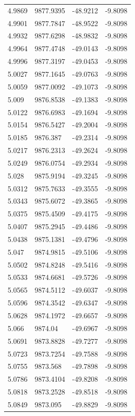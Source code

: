 \begin{table}[H]
\begin{tabular}{llll}
4.9869 & 9877.9395 & -48.9212 & -9.8098 \\
4.9901 & 9877.7847 & -48.9522 & -9.8098 \\
4.9932 & 9877.6298 & -48.9832 & -9.8098 \\
4.9964 & 9877.4748 & -49.0143 & -9.8098 \\
4.9996 & 9877.3197 & -49.0453 & -9.8098 \\
5.0027 & 9877.1645 & -49.0763 & -9.8098 \\
5.0059 & 9877.0092 & -49.1073 & -9.8098 \\
5.009 & 9876.8538 & -49.1383 & -9.8098 \\
5.0122 & 9876.6983 & -49.1694 & -9.8098 \\
5.0154 & 9876.5427 & -49.2004 & -9.8098 \\
5.0185 & 9876.387 & -49.2314 & -9.8098 \\
5.0217 & 9876.2313 & -49.2624 & -9.8098 \\
5.0249 & 9876.0754 & -49.2934 & -9.8098 \\
5.028 & 9875.9194 & -49.3245 & -9.8098 \\
5.0312 & 9875.7633 & -49.3555 & -9.8098 \\
5.0343 & 9875.6072 & -49.3865 & -9.8098 \\
5.0375 & 9875.4509 & -49.4175 & -9.8098 \\
5.0407 & 9875.2945 & -49.4486 & -9.8098 \\
5.0438 & 9875.1381 & -49.4796 & -9.8098 \\
5.047 & 9874.9815 & -49.5106 & -9.8098 \\
5.0502 & 9874.8248 & -49.5416 & -9.8098 \\
5.0533 & 9874.6681 & -49.5726 & -9.8098 \\
5.0565 & 9874.5112 & -49.6037 & -9.8098 \\
5.0596 & 9874.3542 & -49.6347 & -9.8098 \\
5.0628 & 9874.1972 & -49.6657 & -9.8098 \\
5.066 & 9874.04 & -49.6967 & -9.8098 \\
5.0691 & 9873.8828 & -49.7277 & -9.8098 \\
5.0723 & 9873.7254 & -49.7588 & -9.8098 \\
5.0755 & 9873.568 & -49.7898 & -9.8098 \\
5.0786 & 9873.4104 & -49.8208 & -9.8098 \\
5.0818 & 9873.2528 & -49.8518 & -9.8098 \\
5.0849 & 9873.095 & -49.8829 & -9.8098 \\

\end{tabular}
\end{table}
